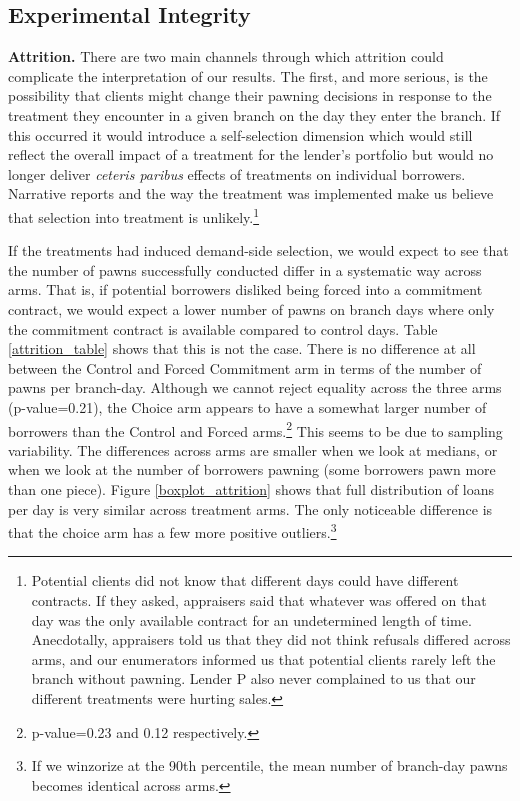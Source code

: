 \documentclass[ecta,nameyear,final]{econsocart}
\begin{document}
\subsection{Experimental Integrity}
\label{sec:integrity}

\noindent \textbf{Attrition.} There are two main channels through which attrition could complicate the interpretation of our results. The first, and more serious, is the possibility that clients might change their pawning decisions in response to the treatment they encounter in a given branch on the day they enter the branch.  If this occurred it would introduce a self-selection dimension which would still reflect the overall impact of a treatment for the lender's portfolio but would no longer deliver \textit{ceteris paribus} effects of treatments on individual borrowers.  Narrative reports and the way the treatment was implemented make us believe that selection into treatment is unlikely.\footnote{Potential clients did not know that different days could have different contracts. If they asked, appraisers said that whatever was offered on that day was the only available contract for an undetermined length of time. Anecdotally, appraisers told us that they did not think refusals differed across arms, and our enumerators informed us that potential clients rarely left the branch without pawning. Lender P also never complained to us that our different treatments were hurting sales.} 

If the treatments had induced demand-side selection, we would expect to see that the number of pawns successfully conducted differ in a systematic way across arms. That is, if potential borrowers disliked being forced into a commitment contract, we would expect a lower number of pawns on branch days where only the commitment contract is available compared to control days. Table \ref{attrition_table} shows that this is not the case. There is no difference at all between the Control and Forced Commitment arm in terms of the number of pawns per branch-day. Although we cannot reject equality across the three arms (p-value=0.21), the Choice arm appears to have a somewhat larger number of borrowers than the Control and Forced arms.\footnote{p-value=0.23 and 0.12 respectively.} This seems to be due to sampling variability. The differences across arms are smaller when we look at medians, or when we look at the number of borrowers pawning (some borrowers pawn more than one piece). Figure \ref{boxplot_attrition} shows that full distribution of loans per day is very similar across treatment arms. The only noticeable difference is that the choice arm has a few more positive outliers.\footnote{If we winzorize at the 90th percentile, the mean number of branch-day pawns becomes identical across arms.}
\end{document}
